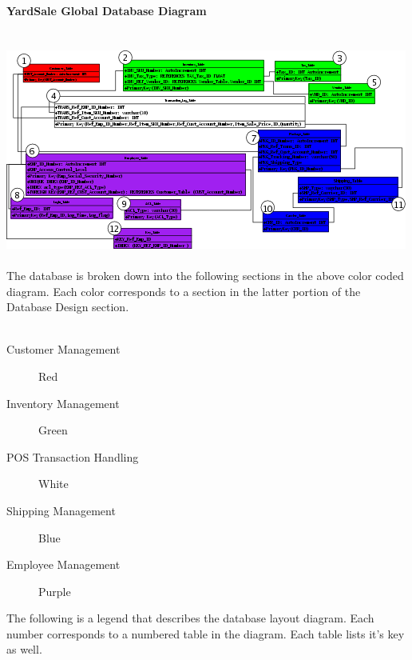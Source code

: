 \documentclass{report}
\begin{document}
    {\bf YardSale Global Database Diagram}\\
    \\
    \\
    \includegraphics{Database_Layout_REDUCED.png}\\
    \\
    The database is broken down into the following sections in the above color coded
    diagram. Each color corresponds to a section in the latter portion of the Database
    Design section.\\
    \\
    \begin{description}
	\item[Customer Management]{Red}
	\item[Inventory Management]{Green}
	\item[POS Transaction Handling]{White}
	\item[Shipping Management]{Blue}
	\item[Employee Management]{Purple}
    \end{description}

    The following is a legend that describes the database layout diagram. Each number corresponds
    to a numbered table in the diagram. Each table lists it's key as well.\\
\end{document}
